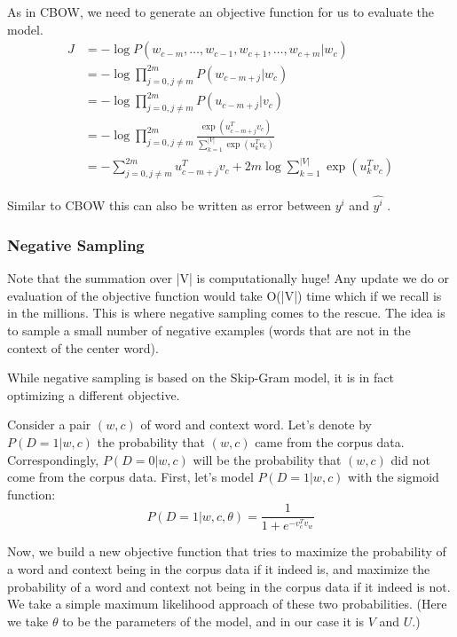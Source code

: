 \documentclass[12pt]{article}
\begin{document}
            As in CBOW, we need to generate an objective function for us to
            evaluate the model. 
            \begin{align*}
                J &= - \log P(w_{c-m}, \ldots, w_{c-1}, w_{c+1}, \ldots, w_{c+m}|w_c) \\
                &= - \log \prod_{j=0, j \neq m}^{2m} P(w_{c-m+j}|w_c) \\
                &= - \log \prod_{j=0, j \neq m}^{2m} P(u_{c-m+j}|v_c) \\
                &= - \log \prod_{j=0, j \neq m}^{2m} \frac{\exp(u_{c-m+j}^T v_c)}{\sum_{k=1}^{|V|} \exp(u_k^T v_c)} \\
                &= - \sum_{j=0, j \neq m}^{2m} u_{c-m+j}^T v_c + 2m \log \sum_{k=1}^{|V|} \exp(u_k^T v_c)
            \end{align*}

            Similar to CBOW this can also be written as error between $y^i$ and $\hat{y^i}$ .
        \subsubsection{Negative Sampling}
        Note that the
        summation over |V| is computationally huge! Any update we do or
        evaluation of the objective function would take O(|V|) time which
        if we recall is in the millions. This is where negative sampling comes
        to the rescue. The idea is to sample a small number of negative
        examples (words that are not in the context of the center word).

        While negative sampling is based on the Skip-Gram
        model, it is in fact optimizing a different objective.

        Consider a pair $(w, c)$ of word and context word.
        Let's denote by $P(D = 1|w, c)$ the probability that $(w, c)$ came from the corpus data. Correspondingly, $P(D = 0|w, c)$ will be the
        probability that $(w, c)$ did not come from the corpus data. First, let's model $P(D = 1|w, c)$ with the sigmoid function:
        \[P(D = 1|w, c, \theta) = \frac{1}{1 + e^{-v_c^T v_w}}\]
         
        Now, we build a new objective function that tries to maximize the probability of a word and context being in the corpus data if it indeed is, and maximize the probability of a word and context not being in the corpus data if it indeed is not. We take a simple maximum likelihood approach of these two probabilities. (Here we take $\theta$ to be the parameters of the model, and in our case it is $V$ and $U$.)
\end{document}
